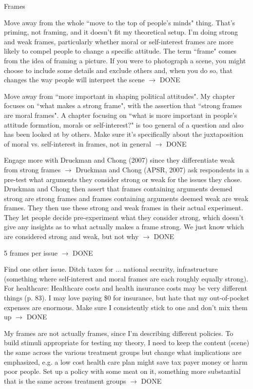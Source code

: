 \documentclass[12pt]{article}
\begin{document}
\begin{coi}
\begin{coi}
			\end{coi}
		\item Frames
			\begin{coi}
				\item Move away from the whole ``move to the top of people's minds" thing. That's priming, not framing, and it doesn't fit my theoretical setup. I'm doing strong and weak frames, particularly whether moral or self-interest frames are more likely to compel people to change a specific attitude. The term ``frame" comes from the idea of framing a picture. If you were to photograph a scene, you might choose to include some details and exclude others and, when you do so, that changes the way people will interpret the scene $\rightarrow$ DONE
				\item Move away from ``more important in shaping political attitudes". My chapter focuses on ``what makes a strong frame", with the assertion that ``strong frames are moral frames". A chapter focusing on ``what is more important in people's attitude formation, morals or self-interest?" is too general of a question and also has been looked at by others. Make sure it's specifically about the juxtaposition of moral vs. self-interest in frames, not in general $\rightarrow$ DONE
				\item Engage more with Druckman and Chong (2007) since they differentiate weak from strong frames $\rightarrow$ Druckman and Chong (APSR, 2007) ask respondents in a pre-test what arguments they consider strong or weak for the issues they chose. Druckman and Chong then assert that frames containing arguments deemed strong are strong frames and frames containing arguments deemed weak are weak frames. They then use these strong and weak frames in their actual experiment. They let people decide pre-experiment what they consider strong, which doesn't give any insights as to what actually makes a frame strong. We just know which are considered strong and weak, but not why $\rightarrow$ DONE
				\item 5 frames per issue $\rightarrow$ DONE
				\item Find one other issue. Ditch taxes for ... national security, infrastructure (something where self-interest and moral frames are each roughly equally strong). For healthcare: Healthcare costs and health insurance costs  may be very different things (p. 83). I may love paying \$0 for insurance, but hate that my out-of-pocket expenses are enormous. Make sure I consistently stick to one and don't mix them up $\rightarrow$ DONE
				\item My frames are not actually frames, since I'm describing different policies. To build stimuli appropriate for testing my theory, I need to keep the content (scene) the same across the various treatment groups but change what implications are emphasized, e.g. a low cost health care plan might save tax payer money or harm poor people. Set up a policy with some meat on it, something more substantial that is the same across treatment groups $\rightarrow$ DONE

\end{coi}
\end{coi}
\end{document}
